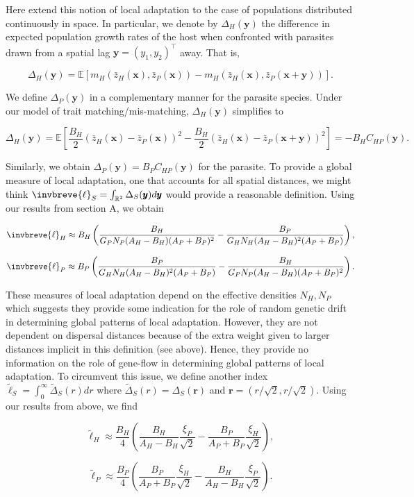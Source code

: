 \documentclass{article}
\begin{document}
Here extend this notion of local adaptation to the case of populations
distributed continuously in space. In particular, we denote by
\(\Delta_H(\pmb y)\) the difference in expected population growth rates
of the host when confronted with parasites drawn from a spatial lag
\(\pmb y=(y_1,y_2)^\top\) away. That is,

\[\Delta_H(\pmb y)=\mathbb E[m_H(\bar z_H(\pmb x),\bar z_P(\pmb x))-m_H(\bar z_H(\pmb x),\bar z_P(\pmb x+\pmb y))].\]

We define \(\Delta_P(\pmb y)\) in a complementary manner for the
parasite species. Under our model of trait matching/mis-matching,
\(\Delta_H(\pmb y)\) simplifies to

\[\Delta_H(\pmb y)=\mathbb E\left[\frac{B_H}{2}\left(\bar z_H(\pmb x)-\bar z_P(\pmb x)\right)^2-\frac{B_H}{2}\left(\bar z_H(\pmb x)-\bar z_P(\pmb x+\pmb y)\right)^2\right]=-B_HC_{HP}(\pmb y).\]

Similarly, we obtain \(\Delta_P(\pmb y)=B_PC_{HP}(\pmb y)\) for the
parasite. To provide a global measure of local adaptation, one that
accounts for all spatial distances, we might think
\(\invbreve{\ell}_S=\int_{\mathbb R^2}\Delta_S(\pmb y)d\pmb y\) would
provide a reasonable definition. Using our results from section A, we
obtain

\[\invbreve{\ell}_H\approx B_H\left(\frac{B_H}{G_PN_P(A_H-B_H)(A_P+B_P)^2}-\frac{B_P}{G_HN_H(A_H-B_H)^2(A_P+B_P)}\right),\]

\[\invbreve{\ell}_P\approx B_P\left(\frac{B_P}{G_HN_H(A_H-B_H)^2(A_P+B_P)}-\frac{B_H}{G_PN_P(A_H-B_H)(A_P+B_P)^2}\right).\]

These measures of local adaptation depend on the effective densities
\(N_H,N_P\) which suggests they provide some indication for the role of
random genetic drift in determining global patterns of local adaptation.
However, they are not dependent on dispersal distances because of the
extra weight given to larger distances implicit in this definition (see
above). Hence, they provide no information on the role of gene-flow in
determining global patterns of local adaptation. To circumvent this
issue, we define another index
\(\tilde{\ell}_S=\int_0^\infty\tilde\Delta_S(r)dr\) where
\(\tilde\Delta_S(r)=\Delta_S(\pmb r)\) and
\(\pmb r=(r/\sqrt2,r/\sqrt2)\). Using our results from above, we find

\[\tilde{\ell}_H\approx\frac{B_H}{4}\left(\frac{B_H}{A_H-B_H}\frac{\xi_P}{\sqrt2}-\frac{B_P}{A_P+B_P}\frac{\xi_H}{\sqrt2}\right),\]

\[\tilde{\ell}_P\approx\frac{B_P}{4}\left(\frac{B_P}{A_P+B_P}\frac{\xi_H}{\sqrt2}-\frac{B_H}{A_H-B_H}\frac{\xi_P}{\sqrt2}\right).\]
\end{document}
